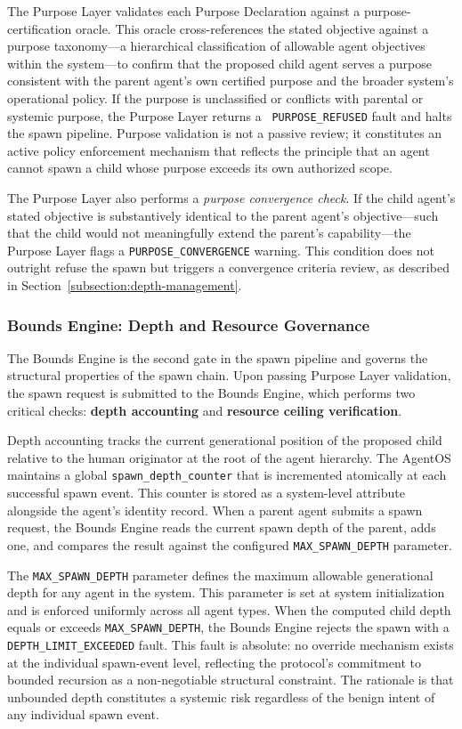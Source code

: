 The Purpose Layer validates each Purpose Declaration against a purpose-certification oracle. This oracle cross-references the stated objective against a purpose taxonomy—a hierarchical classification of allowable agent objectives within the system—to confirm that the proposed child agent serves a purpose consistent with the parent agent's own certified purpose and the broader system's operational policy. If the purpose is unclassified or conflicts with parental or systemic purpose, the Purpose Layer returns a \texttt{ PURPOSE\_REFUSED} fault and halts the spawn pipeline. Purpose validation is not a passive review; it constitutes an active policy enforcement mechanism that reflects the principle that an agent cannot spawn a child whose purpose exceeds its own authorized scope.

The Purpose Layer also performs a \emph{purpose convergence check}. If the child agent's stated objective is substantively identical to the parent agent's objective—such that the child would not meaningfully extend the parent's capability—the Purpose Layer flags a \texttt{PURPOSE\_CONVERGENCE} warning. This condition does not outright refuse the spawn but triggers a convergence criteria review, as described in Section~\ref{subsection:depth-management}.

\subsubsection{Bounds Engine: Depth and Resource Governance}
\label{subsection:bounds-engine}

The Bounds Engine is the second gate in the spawn pipeline and governs the structural properties of the spawn chain. Upon passing Purpose Layer validation, the spawn request is submitted to the Bounds Engine, which performs two critical checks: \textbf{depth accounting} and \textbf{resource ceiling verification}.

Depth accounting tracks the current generational position of the proposed child relative to the human originator at the root of the agent hierarchy. The AgentOS maintains a global \texttt{spawn\_depth\_counter} that is incremented atomically at each successful spawn event. This counter is stored as a system-level attribute alongside the agent's identity record. When a parent agent submits a spawn request, the Bounds Engine reads the current spawn depth of the parent, adds one, and compares the result against the configured \texttt{MAX\_SPAWN\_DEPTH} parameter.

The \texttt{MAX\_SPAWN\_DEPTH} parameter defines the maximum allowable generational depth for any agent in the system. This parameter is set at system initialization and is enforced uniformly across all agent types. When the computed child depth equals or exceeds \texttt{MAX\_SPAWN\_DEPTH}, the Bounds Engine rejects the spawn with a \texttt{DEPTH\_LIMIT\_EXCEEDED} fault. This fault is absolute: no override mechanism exists at the individual spawn-event level, reflecting the protocol's commitment to bounded recursion as a non-negotiable structural constraint. The rationale is that unbounded depth constitutes a systemic risk regardless of the benign intent of any individual spawn event.

